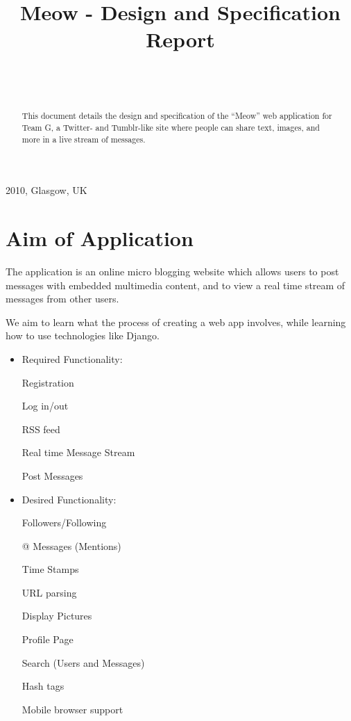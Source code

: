 \documentclass{sig-alt-release2}
\begin{document}
\newcommand{\todo}[1]{\textcolor{red}{#1}}
\def\newblock{\hskip .11em plus .33em minus .07em}

 {2010, Glasgow, UK}

\title{Meow - Design and Specification Report}

\author{
\alignauthor
    \\
    \\
}
\maketitle

\begin{abstract}
This document details the design and specification of the ``Meow'' web application for Team G, a Twitter- and Tumblr-like site where people can share text, images, and more in a live stream of messages.
\end{abstract}

\section{Aim of Application}
The application is an online micro blogging website which allows users to post messages with embedded multimedia content, and to view a real time stream of messages from other users.

We aim to learn what the process of creating a web app involves, while learning how to use technologies like Django.

\begin{itemize}
\item	Required Functionality:

Registration

Log in/out

RSS feed

Real time Message Stream

Post Messages

\item	Desired Functionality:

Followers/Following

@ Messages (Mentions)

Time Stamps

URL parsing

Display Pictures

Profile Page

Search (Users and Messages)

Hash tags

Mobile browser support
\end{itemize}
\end{document}
